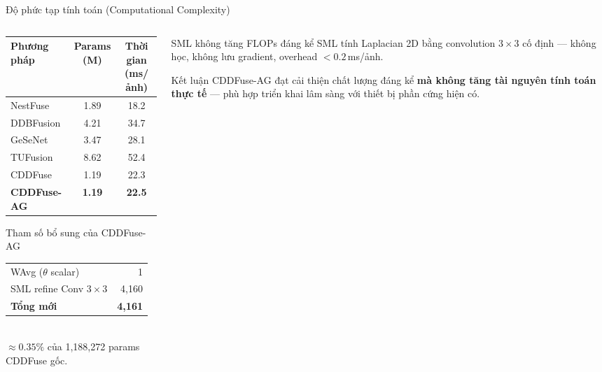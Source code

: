 \documentclass[t, aspectratio=169]{beamer}
\begin{document}
\begin{frame}{Độ phức tạp tính toán (Computational Complexity)}
    \begin{columns}[T]
        \begin{column}{0.54\textwidth}
            \small
            \begin{tabular}{lcc}
                \toprule
                \textbf{Phương pháp} & \textbf{Params (M)} & \textbf{Thời gian (ms/ảnh)} \\
                \midrule
                NestFuse   & 1.89 & 18.2 \\
                DDBFusion  & 4.21 & 34.7 \\
                GeSeNet    & 3.47 & 28.1 \\
                TUFusion   & 8.62 & 52.4 \\
                CDDFuse    & 1.19 & 22.3 \\
                \midrule
                \rowcolor{red!12}
                \textbf{CDDFuse-AG} & \textbf{1.19} & \textbf{22.5} \\
                \bottomrule
            \end{tabular}
            \vspace{0.4em}
            \begin{block}{\small Tham số bổ sung của CDDFuse-AG}
                \small
                \begin{tabular}{lr}
                    WAvg ($\theta$ scalar)  & 1 \\
                    SML refine Conv $3\times3$ & 4,160 \\
                    \midrule
                    \textbf{Tổng mới} & \textbf{4,161} \\
                \end{tabular}\\[2pt]
                \footnotesize $\approx 0.35\%$ của 1,188,272 params CDDFuse gốc.
            \end{block}
        \end{column}
        \begin{column}{0.42\textwidth}
            \begin{alertblock}{SML không tăng FLOPs đáng kể}
                \small SML tính Laplacian 2D bằng convolution $3\times3$ cố định --- không học, không lưu gradient, overhead $<0.2\,$ms/ảnh.
            \end{alertblock}
            \vspace{0.5em}
            \begin{block}{\small Kết luận}
                \small CDDFuse-AG đạt cải thiện chất lượng đáng kể \textbf{mà không tăng tài nguyên tính toán thực tế} --- phù hợp triển khai lâm sàng với thiết bị phần cứng hiện có.
            \end{block}
        \end{column}
    \end{columns}
\end{frame}
\end{document}
